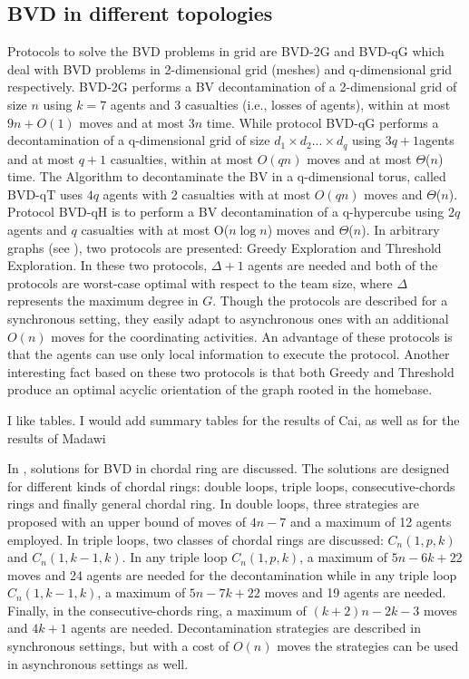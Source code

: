 \subsection{BVD in different topologies}
Protocols to solve the  BVD problems in grid are BVD-2G and BVD-qG which deal with BVD problems in 2-dimensional grid (meshes) and q-dimensional grid respectively. BVD-2G performs a BV decontamination of a 2-dimensional grid of size $n$ using $k=7$ agents and 3 casualties (i.e., losses of agents), within at most $9n+O(1)$ moves and at most $3n$ time. While protocol BVD-qG performs a decontamination of a q-dimensional grid of size $d_1\times d_2 ...\times d_q$ using $3q+1$agents and at most $q+1$ casualties, within at most $O(qn)$ moves and at most $\Theta$($n$) time. The Algorithm to decontaminate the BV in a q-dimensional torus, called BVD-qT uses $4q$ agents with 2 casualties with at most $O(qn)$ moves and $\Theta$($n$). Protocol BVD-qH is to perform a BV decontamination of a q-hypercube using $2q$ agents and $q$ casualties with at most O($n\log n$) moves and $\Theta$($n$). In arbitrary graphs (see \cite{cai1}), two protocols are presented: {\sc Greedy Exploration} and {\sc Threshold Exploration}. In these two protocols, $\Delta +1$ agents are needed and both of the protocols are worst-case optimal with respect to the team size, where $\Delta$ represents the maximum degree in $G$. Though the protocols are described for a synchronous setting, they easily adapt to asynchronous ones with an additional $O(n)$ moves for the coordinating activities. An advantage of these protocols is that the agents can use only local information to execute the protocol. Another interesting fact based on these two protocols is that both {\sc Greedy} and {\sc Threshold}   produce an optimal acyclic orientation of the graph rooted in the homebase.

\color{blue}
I like tables. I would add summary tables for the results of Cai, as well as for the results of Madawi 
\color{black}

In \cite{alotaibi}, solutions for BVD in chordal ring are discussed. The solutions are designed for  different kinds of chordal rings: double loops, triple loops, consecutive-chords rings and finally general chordal ring. In double loops,     three strategies  are proposed  
with an  upper bound of moves of  $4n-7$  and a maximum of 12 agents   employed.
In triple loops,  two classes of chordal rings are discussed: $C_n(1,p,k)$  and $C_n(1,k-1,k)$. In any triple loop $C_n(1,p,k)$, a maximum of $5n-6k+22$ moves and 24 agents are needed for the decontamination while in any triple loop $C_n(1,k-1,k)$, a maximum of $5n-7k+22$ moves and 19 agents are needed. Finally, in the consecutive-chords ring, a maximum of $(k+2)n-2k-3$ moves and $4k+1$ agents are needed. Decontamination strategies  are described  in synchronous settings, but   with a cost of $O(n)$ moves   the strategies can be used in asynchronous settings as well.







 










